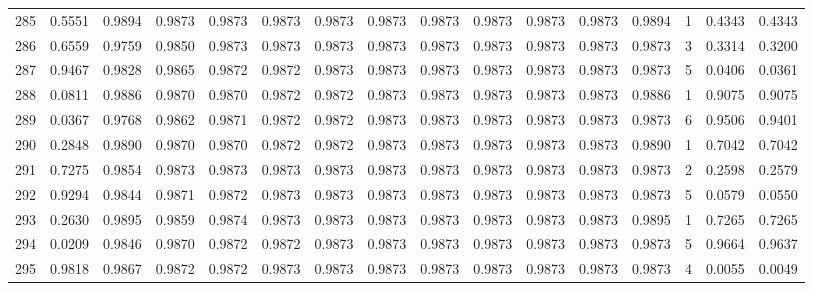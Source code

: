 \begin{tabular}{lrrrrrrrrrrrrrrr}
285 &      0.5551 &  0.9894 &  0.9873 &  0.9873 &  0.9873 &  0.9873 &  0.9873 &  0.9873 &  0.9873 &  0.9873 &   0.9873 &     0.9894 &      1 &                    0.4343 &                     0.4343 \\
286 &      0.6559 &  0.9759 &  0.9850 &  0.9873 &  0.9873 &  0.9873 &  0.9873 &  0.9873 &  0.9873 &  0.9873 &   0.9873 &     0.9873 &      3 &                    0.3314 &                     0.3200 \\
287 &      0.9467 &  0.9828 &  0.9865 &  0.9872 &  0.9872 &  0.9873 &  0.9873 &  0.9873 &  0.9873 &  0.9873 &   0.9873 &     0.9873 &      5 &                    0.0406 &                     0.0361 \\
288 &      0.0811 &  0.9886 &  0.9870 &  0.9870 &  0.9872 &  0.9872 &  0.9873 &  0.9873 &  0.9873 &  0.9873 &   0.9873 &     0.9886 &      1 &                    0.9075 &                     0.9075 \\
289 &      0.0367 &  0.9768 &  0.9862 &  0.9871 &  0.9872 &  0.9872 &  0.9873 &  0.9873 &  0.9873 &  0.9873 &   0.9873 &     0.9873 &      6 &                    0.9506 &                     0.9401 \\
290 &      0.2848 &  0.9890 &  0.9870 &  0.9870 &  0.9872 &  0.9872 &  0.9873 &  0.9873 &  0.9873 &  0.9873 &   0.9873 &     0.9890 &      1 &                    0.7042 &                     0.7042 \\
291 &      0.7275 &  0.9854 &  0.9873 &  0.9873 &  0.9873 &  0.9873 &  0.9873 &  0.9873 &  0.9873 &  0.9873 &   0.9873 &     0.9873 &      2 &                    0.2598 &                     0.2579 \\
292 &      0.9294 &  0.9844 &  0.9871 &  0.9872 &  0.9873 &  0.9873 &  0.9873 &  0.9873 &  0.9873 &  0.9873 &   0.9873 &     0.9873 &      5 &                    0.0579 &                     0.0550 \\
293 &      0.2630 &  0.9895 &  0.9859 &  0.9874 &  0.9873 &  0.9873 &  0.9873 &  0.9873 &  0.9873 &  0.9873 &   0.9873 &     0.9895 &      1 &                    0.7265 &                     0.7265 \\
294 &      0.0209 &  0.9846 &  0.9870 &  0.9872 &  0.9872 &  0.9873 &  0.9873 &  0.9873 &  0.9873 &  0.9873 &   0.9873 &     0.9873 &      5 &                    0.9664 &                     0.9637 \\
295 &      0.9818 &  0.9867 &  0.9872 &  0.9872 &  0.9873 &  0.9873 &  0.9873 &  0.9873 &  0.9873 &  0.9873 &   0.9873 &     0.9873 &      4 &                    0.0055 &                     0.0049 \\

\end{tabular}
